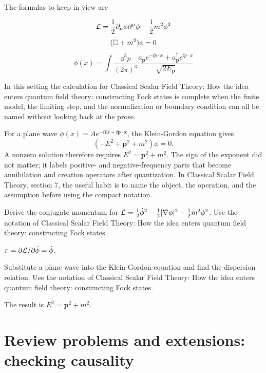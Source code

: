The formulas to keep in view are

\[
  \mathcal L=\frac12\partial_\mu\phi\partial^\mu\phi-\frac12m^2\phi^2
\]
\[
  (\Box+m^2)\phi=0
\]
\[
  \phi(x)=\int\frac{\dd^3p}{(2\pi)^3}\frac{a_{\bm p}e^{-\ii p\cdot x}+a_{\bm p}^\dagger e^{\ii p\cdot x}}{\sqrt{2E_{\bm p}}}
\]

In this setting the calculation for Classical Scalar Field Theory: How the idea enters quantum field theory: constructing Fock states is complete when the finite model, the limiting step, and the normalization or boundary condition can all be named without looking back at the prose.




\begin{example}
For a plane wave \(\phi(x)=Ae^{-\ii Et+\ii\bm p\cdot\bm x}\), the Klein-Gordon equation gives
\[
  (-E^2+\bm p^2+m^2)\phi=0.
\]
A nonzero solution therefore requires \(E^2=\bm p^2+m^2\).  The sign of the exponent did not matter; it labels positive- and negative-frequency parts that become annihilation and creation operators after quantization.  In Classical Scalar Field Theory, section 7, the useful habit is to name the object, the operation, and the assumption before using the compact notation.
\end{example}



\begin{exercise}
Derive the conjugate momentum for \(\mathcal L=\frac12\dot\phi^2-\frac12|\nabla\phi|^2-\frac12m^2\phi^2\).  Use the notation of Classical Scalar Field Theory: How the idea enters quantum field theory: constructing Fock states.
\begin{answer}
\(\pi=\partial\mathcal L/\partial\dot\phi=\dot\phi\).
\end{answer}
\end{exercise}

\begin{exercise}
Substitute a plane wave into the Klein-Gordon equation and find the dispersion relation.  Use the notation of Classical Scalar Field Theory: How the idea enters quantum field theory: constructing Fock states.
\begin{answer}
The result is \(E^2=\bm p^2+m^2\).
\end{answer}
\end{exercise}



\section{Review problems and extensions: checking causality}

